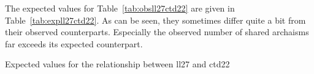 

The expected values for Table~\ref{tab:obsll27ctd22} are given in Table~\ref{tab:expll27ctd22}. As can be seen, they sometimes differ quite a bit from their observed counterparts. Especially the observed number of shared archaisms far exceeds its expected counterpart. 

\begin{table}[h]
  \centering
  
  \caption{Expected values for the relationship between \gls{ll27} and \gls{ctd22}}
  \label{tab:expll27ctd22}
\end{table}




